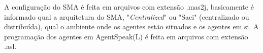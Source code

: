 \documentclass[conference]{IEEEtran}
\begin{document}
        
        
        A configuração do SMA é feita em arquivos com extensão .mas2j, basicamente é informado qual a arquitetura do SMA, "\textit{Centralized}" ou "Saci" (centralizado ou distribuída), qual o ambiente onde os agentes estão situados e os agentes em si. A programação dos agentes em AgentSpeak(L) é feita em arquivos com extensão .asl. %
        

        
        
\end{document}
